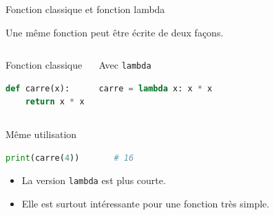 \documentclass[10pt, xcolor={svgnames}]{beamer}
\begin{document}
\begin{frame}[fragile]{Fonction classique et fonction lambda}
	
	Une même fonction peut être écrite de deux façons.
	
	\vspace{0.3cm}
	
	\begin{columns}
		
		\column{5.5cm}
		
		\begin{exampleblock}{Fonction classique}
			\begin{lstlisting}[language=Python]
def carre(x):
	return x * x
			\end{lstlisting}
		\end{exampleblock}
		
		\column{5.5cm}
		
		\begin{exampleblock}{Avec \texttt{lambda}}
			\begin{lstlisting}[language=Python]
carre = lambda x: x * x
			\end{lstlisting}
		\end{exampleblock}
		
	\end{columns}
	
	\vspace{0.4cm}
	
	\begin{block}{Même utilisation}
		\begin{lstlisting}[language=Python]
print(carre(4))       # 16
		\end{lstlisting}
	\end{block}
	
	\begin{itemize}
		\item La version \texttt{lambda} est plus courte.
		\item Elle est surtout intéressante pour une fonction très simple.
	\end{itemize}
	
\end{frame}
\end{document}

